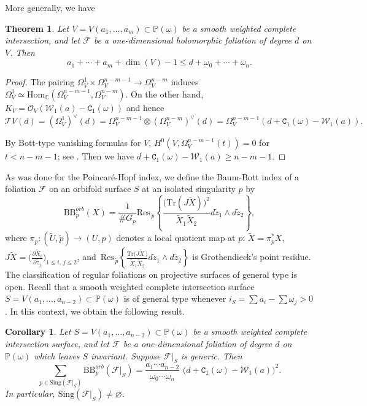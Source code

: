 \documentclass[11pt]{amsart}
\theoremstyle{plain}
\newtheorem{teo}{Theorem}[section]
\newtheorem{cor}{Corollary}[section]
\theoremstyle{definition}
\begin{document}
More generally, we have 

\begin{teo} \label{teo3} 
Let $V=V(a_1,\ldots,a_m)\subset\mathbb{P}(\omega)$ be a smooth weighted complete intersection, 
and let $\mathcal{F}$ be a one-dimensional holomorphic foliation of degree $d$ on $V$. Then 
$$a_1+\cdots+a_m+\dim(V)-1\leq d+\omega_0+\cdots+\omega_n.$$
\end{teo}

\begin{proof} 
The pairing $\Omega^1_{V}\times\Omega^{n-m-1}_{V}\rightarrow\Omega^{n-m}_V$ induces
$\Omega^1_{V}\simeq\mathrm{Hom}_{\mathbb{C}}(\Omega^{n-m-1}_{V},\Omega^{n-m}_V)$.
On the other hand, $K_{V}=\mathcal{O}_{V}(\mathcal{W}_1(a)-\texttt{C}_1(\omega))$ and hence 
$$\mathcal{T}V(d)=(\Omega^1_{V})^{\vee}(d)=\Omega^{n-m-1}_{V}
\otimes(\Omega^{n-m}_{V})^{\vee}(d)=\Omega^{n-m-1}_{V}(d+\texttt{C}_1(\omega)-\mathcal{W}_1(a)).$$

By Bott-type vanishing formulas for $V$, $H^{0}(V, \Omega_{V}^{n-m-1}(t))=0$ for $t<n-m-1$; 
see \cite[Satz 8.11]{Fle}. Then we have $d+\texttt{C}_1(\omega)-\mathcal{W}_1(a)\geq n-m-1$.
\end{proof}

\bigskip

As was done for the Poincar\'e-Hopf index, we define the Baum-Bott index of a foliation $\mathcal{F}$
on an orbifold surface $S$ at an isolated singularity $p$ by 
$$\mathrm{BB}_p^{orb}\left(X\right)=\frac{1}{\#G_p}\mathrm{Res}_{\,\tilde{p}}
\left\{\frac{\big(\mathrm{Tr}(J\tilde{X})\big)^2}{\tilde{X}_1\tilde{X}_2}d\tilde{z}_1\wedge d\tilde{z}_2\right\},$$
where $\pi_p:(\widetilde{U},\tilde{p})\rightarrow(U,p)$ denotes a local quotient map at $p$:
$\tilde{X}= \pi_p^\ast X$,
$J{\tilde{X}}=\big(\frac{\partial\tilde{X}_i}{\partial\tilde{z}_j}\big)_{1\leq i,\,j\leq 2}$, and 
$\,\mathrm{Res}_{\,\tilde{p}}\displaystyle\left\{\frac{\mathrm{Tr}\big(J\tilde{X}\,\big)}
{\tilde{X}_1\tilde{X}_2}d\tilde{z}_1\wedge d\tilde{z}_2\right\}$ is Grothendieck's point residue.\\

The classification of regular foliations on projective surfaces of general type is open. 
Recall that a smooth weighted complete intersection surface $S=V(a_1,\ldots,a_{n-2})\subset\mathbb{P}(\omega)$ 
is of general type whenever $i_S=\sum a_i-\sum \omega_j>0$. In this context, we obtain the following result.

\begin{cor} \label{cwp}
Let $S=V(a_1,\ldots,a_{n-2})\subset\mathbb{P}(\omega)$ be a smooth weighted complete intersection surface, 
and let $\mathcal{F}$ be a one-dimensional foliation of degree $d$ on $\mathbb{P}(\omega)$ 
which leaves $S$ invariant. Suppose $\mathcal{F}|_S$ is generic. Then 
$$\sum_{p\in\mathrm{Sing}\left(\mathcal{F}|_S\right)}\mathrm{BB}_p^{orb}(\mathcal{F}|_S)
=\frac{a_1\cdots a_{n-2}}{\omega_0\cdots\omega_n}\,\,\big(d+\texttt{C}_1(\omega)-\mathcal{W}_1(a)\big)^2.$$
In particular, $\mathrm{Sing}(\mathcal{F}|_S)\neq\varnothing$. 
\end{cor}
\end{document}
